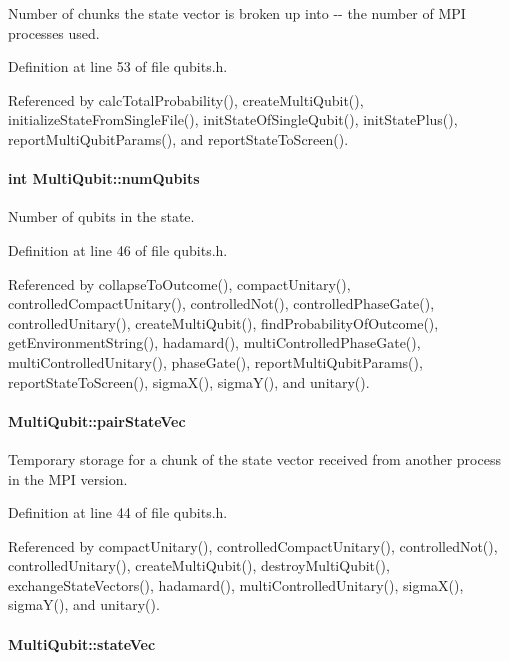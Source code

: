 Number of chunks the state vector is broken up into -\/-\/ the number of MPI processes used. 

Definition at line 53 of file qubits.h.

Referenced by calcTotalProbability(), createMultiQubit(), initializeStateFromSingleFile(), initStateOfSingleQubit(), initStatePlus(), reportMultiQubitParams(), and reportStateToScreen().\hypertarget{structMultiQubit_ab5b9795bdc6fb5855e1974dcbbaeb36f}{
\paragraph[{numQubits}]{\setlength{\rightskip}{0pt plus 5cm}int {\bf MultiQubit::numQubits}}\hfill}
\label{structMultiQubit_ab5b9795bdc6fb5855e1974dcbbaeb36f}


Number of qubits in the state. 

Definition at line 46 of file qubits.h.

Referenced by collapseToOutcome(), compactUnitary(), controlledCompactUnitary(), controlledNot(), controlledPhaseGate(), controlledUnitary(), createMultiQubit(), findProbabilityOfOutcome(), getEnvironmentString(), hadamard(), multiControlledPhaseGate(), multiControlledUnitary(), phaseGate(), reportMultiQubitParams(), reportStateToScreen(), sigmaX(), sigmaY(), and unitary().\hypertarget{structMultiQubit_a76f7db4eab52d2b30f58f973ada809c5}{
\paragraph[{pairStateVec}]{ {\bf MultiQubit::pairStateVec}}\hfill}
\label{structMultiQubit_a76f7db4eab52d2b30f58f973ada809c5}


Temporary storage for a chunk of the state vector received from another process in the MPI version. 

Definition at line 44 of file qubits.h.

Referenced by compactUnitary(), controlledCompactUnitary(), controlledNot(), controlledUnitary(), createMultiQubit(), destroyMultiQubit(), exchangeStateVectors(), hadamard(), multiControlledUnitary(), sigmaX(), sigmaY(), and unitary().\hypertarget{structMultiQubit_a45483190d6b01ef6b2f98f2bec9ab94f}{
\paragraph[{stateVec}]{ {\bf MultiQubit::stateVec}}\hfill}
\label{structMultiQubit_a45483190d6b01ef6b2f98f2bec9ab94f}



